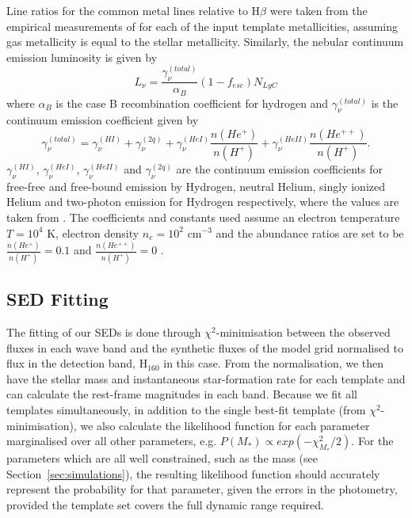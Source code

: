 Line ratios for the common metal lines relative to H$\beta$ were taken from the empirical measurements of \cite{Anders:2003ci} for each of the input template metallicities, assuming gas metallicity is equal to the stellar metallicity.
Similarly, the nebular continuum emission luminosity is given by
\begin{equation}
\label{eq:continuum}
L_{\nu} = \frac{\gamma^{(total)}_{\nu}} {\alpha_{B}}(1-f_{esc}) N_{LyC}
\end{equation}
where $\alpha_{B}$ is the case B recombination coefficient for hydrogen and $\gamma^{(total)}_{\nu}$ is the continuum emission coefficient given by
\begin{equation}\label{eq:cont_sep}
\gamma^{(total)}_{\nu} = \gamma^{(HI)}_{\nu} + \gamma^{(2q)}_{\nu} +  \gamma^{(HeI)}_{\nu}\frac{n(He^{+})} {n(H^{+})} + \gamma^{(HeII)}_{\nu}\frac{n(He^{++})} {n(H^{+})}
.\end{equation}
$\gamma^{(HI)}_{\nu}$, $\gamma^{(HeI)}_{\nu}$, $\gamma^{(HeII)}_{\nu}$ and $\gamma^{(2q)}_{\nu}$ are the continuum emission coefficients for free-free and free-bound emission by Hydrogen, neutral Helium, singly ionized Helium and two-photon emission for Hydrogen respectively, where the values are taken from \cite{Osterbrock:2006ul}. The coefficients and constants used assume an electron temperature $T=10^4$ K, electron density $n_{e}=10^2$ cm$^{-3}$ and the abundance ratios are set to be $\frac{n(He^{+})} {n(H^{+})} = 0.1$ and $\frac{n(He^{++})} {n(H^{+})} = 0$ \citep{1995A&A...303...41K}.

\subsection{SED Fitting}
The fitting of our SEDs is done through $\chi^{2}$-minimisation between the observed fluxes in each wave band and the synthetic fluxes of the model grid normalised to flux in the detection band, H$_{160}$ in this case. From the normalisation, we then have the stellar mass and instantaneous star-formation rate for each template and can calculate the rest-frame magnitudes in each band. Because we fit all templates simultaneously, in addition to the single best-fit template (from $\chi^2$-minimisation), we also calculate the likelihood function for each parameter marginalised over all other parameters, e.g. $P(M_{*}) \propto exp(-\chi_{M_{*}}^{2}/2)$. For the parameters which are all well constrained, such as the mass (see Section~\ref{sec:simulations}), the resulting likelihood function should accurately represent the probability for that parameter, given the errors in the photometry, provided the template set covers the full dynamic range required.

